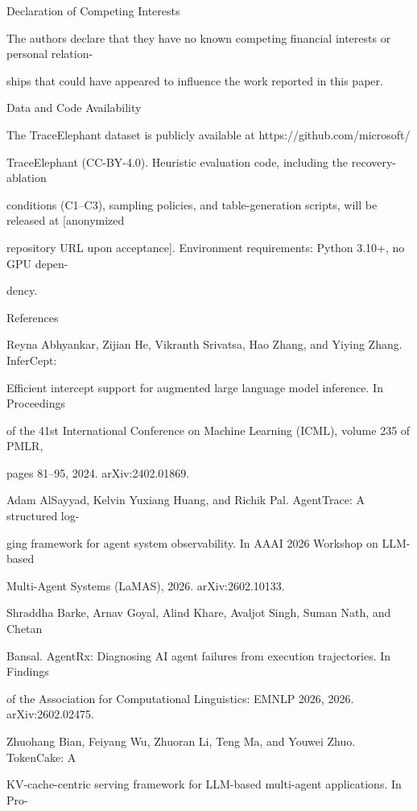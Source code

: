 \begin{flushleft}
\noindent Declaration of Competing Interests\par
\noindent The authors declare that they have no known competing financial interests or personal relation-\par
\noindent ships that could have appeared to influence the work reported in this paper.\par
\par\smallskip
\par\smallskip
\noindent Data and Code Availability\par
\noindent The TraceElephant dataset is publicly available at https://github.com/microsoft/\par
\noindent TraceElephant (CC-BY-4.0). Heuristic evaluation code, including the recovery-ablation\par
\noindent conditions (C1–C3), sampling policies, and table-generation scripts, will be released at [anonymized\par
\noindent repository URL upon acceptance]. Environment requirements: Python 3.10+, no GPU depen-\par
\noindent dency.\par
\par\smallskip
\par\smallskip
\noindent References\par
\noindent  [1] Reyna Abhyankar, Zijian He, Vikranth Srivatsa, Hao Zhang, and Yiying Zhang. InferCept:\par
\noindent  Efficient intercept support for augmented large language model inference. In Proceedings\par
\noindent  of the 41st International Conference on Machine Learning (ICML), volume 235 of PMLR,\par
\noindent  pages 81–95, 2024. arXiv:2402.01869.\par
\par\smallskip
\noindent  [2] Adam AlSayyad, Kelvin Yuxiang Huang, and Richik Pal. AgentTrace: A structured log-\par
\noindent  ging framework for agent system observability. In AAAI 2026 Workshop on LLM-based\par
\noindent  Multi-Agent Systems (LaMAS), 2026. arXiv:2602.10133.\par
\par\smallskip
\noindent  [3] Shraddha Barke, Arnav Goyal, Alind Khare, Avaljot Singh, Suman Nath, and Chetan\par
\noindent  Bansal. AgentRx: Diagnosing AI agent failures from execution trajectories. In Findings\par
\noindent  of the Association for Computational Linguistics: EMNLP 2026, 2026. arXiv:2602.02475.\par
\par\smallskip
\noindent  [4] Zhuohang Bian, Feiyang Wu, Zhuoran Li, Teng Ma, and Youwei Zhuo. TokenCake: A\par
\noindent  KV-cache-centric serving framework for LLM-based multi-agent applications. In Pro-\par
\end{flushleft}

